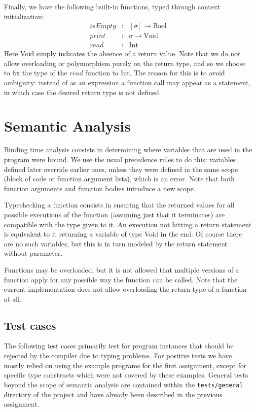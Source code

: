 \documentclass[a4paper]{article}
\begin{document}
Finally, we have the following built-in functions, typed through context initialization:
\[
    \begin{array}{lcl}
        \mathit{isEmpty} & : & [\sigma] \to \text{Bool} \\
        \mathit{print}   & : & \sigma \to \text{Void} \\
        \mathit{read}    & : & \text{Int}
    \end{array}
\]
Here Void simply indicates the absence of a return value.
Note that we do not allow overloading or polymorphism purely on the return type, and so we choose to fix the type of the $\mathit{read}$ function to Int.
The reason for this is to avoid ambiguity: instead of as an expression a function call may appear as a statement, in which case the desired return type is not defined.

\section{Semantic Analysis}

Binding time analysis consists in determining where variables that are used in the program were bound.
We use the usual precedence rules to do this: variables defined later override earlier ones, unless they were defined in the same scope (block of code or function argument lists), which is an error.
Note that both function arguments and function bodies introduce a new scope.

Typechecking a function consists in ensuring that the returned values for all possible executions of the function (assuming just that it terminates) are compatible with the type given to it.
An execution not hitting a return statement is equivalent to it returning a variable of type Void in the end.
Of course there are no such variables, but this is in turn modeled by the return statement without parameter.

Functions may be overloaded, but it is not allowed that multiple versions of a function apply for any possible way the function can be called.
Note that the current implementation does not allow overloading the return type of a function at all.

\subsection{Test cases}

The following test cases primarily test for program instances that should be rejected by the compiler due to typing problems.
For positive tests we have mostly relied on using the example programs for the first assignment, except for specific type constructs which were not covered by these examples.
General tests beyond the scope of semantic analysis are contained within the \verb|tests/general| directory of the project and have already been described in the previous assignment.
\end{document}
